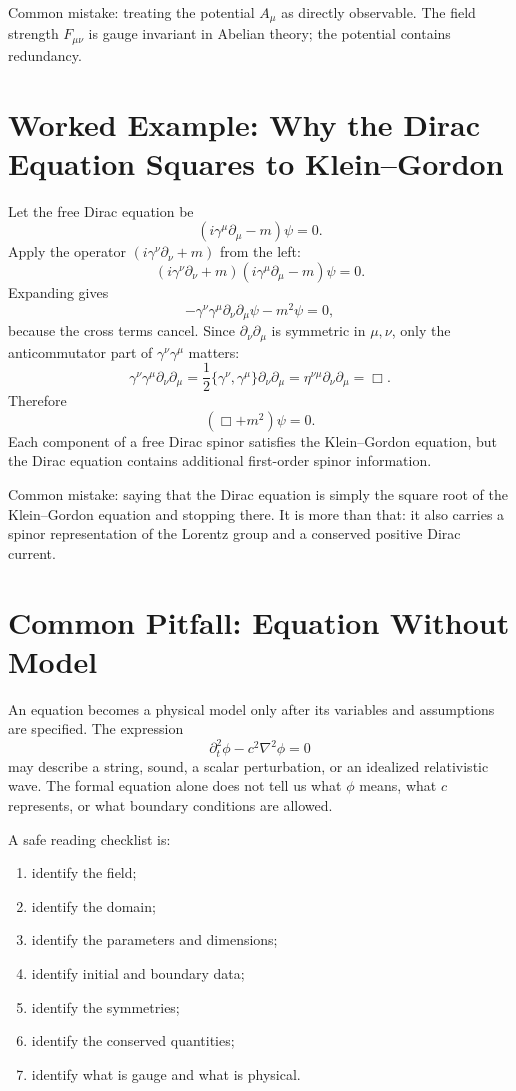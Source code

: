 \begin{remarkbox}
Common mistake: treating the potential \(A_\mu\) as directly observable. The
field strength \(F_{\mu\nu}\) is gauge invariant in Abelian theory; the potential
contains redundancy.
\end{remarkbox}

\section{Worked Example: Why the Dirac Equation Squares to Klein--Gordon}

Let the free Dirac equation be
\[
    (i\gamma^\mu\partial_\mu-m)\psi=0.
\]
Apply the operator \((i\gamma^\nu\partial_\nu+m)\) from the left:
\[
    (i\gamma^\nu\partial_\nu+m)(i\gamma^\mu\partial_\mu-m)\psi=0.
\]
Expanding gives
\[
    -\gamma^\nu\gamma^\mu\partial_\nu\partial_\mu\psi-m^2\psi=0,
\]
because the cross terms cancel. Since \(\partial_\nu\partial_\mu\) is symmetric
in \(\mu,\nu\), only the anticommutator part of \(\gamma^\nu\gamma^\mu\) matters:
\[
    \gamma^\nu\gamma^\mu\partial_\nu\partial_\mu
    =\frac{1}{2}\{\gamma^\nu,\gamma^\mu\}\partial_\nu\partial_\mu
    =\eta^{\nu\mu}\partial_\nu\partial_\mu
    =\Box.
\]
Therefore
\[
    (\Box+m^2)\psi=0.
\]
Each component of a free Dirac spinor satisfies the Klein--Gordon equation, but
the Dirac equation contains additional first-order spinor information.

\begin{remarkbox}
Common mistake: saying that the Dirac equation is simply the square root of the
Klein--Gordon equation and stopping there. It is more than that: it also carries
a spinor representation of the Lorentz group and a conserved positive Dirac
current.
\end{remarkbox}

\section{Common Pitfall: Equation Without Model}

An equation becomes a physical model only after its variables and assumptions are
specified. The expression
\[
    \partial_t^2\phi-c^2\nabla^2\phi=0
\]
may describe a string, sound, a scalar perturbation, or an idealized relativistic
wave. The formal equation alone does not tell us what \(\phi\) means, what
\(c\) represents, or what boundary conditions are allowed.

A safe reading checklist is:
\begin{enumerate}
    \item identify the field;
    \item identify the domain;
    \item identify the parameters and dimensions;
    \item identify initial and boundary data;
    \item identify the symmetries;
    \item identify the conserved quantities;
    \item identify what is gauge and what is physical.
\end{enumerate}

